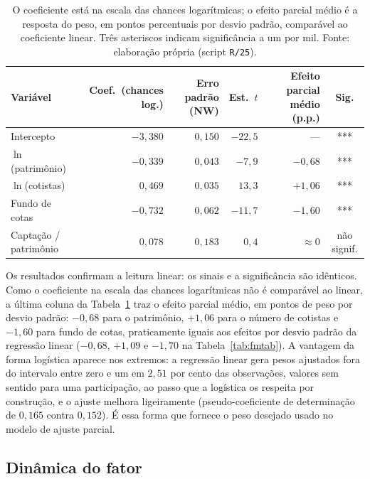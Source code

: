 \documentclass[12pt,a4paper]{article}
\begin{document}
\begin{table}[h]\centering\small
\caption{Regressão transversal logística (resposta fracionária), resumo Fama--MacBeth com
erros-padrão Newey-West.}
\label{tab:logit}
\begin{tabular}{@{}lrrrrc@{}}
\toprule
Variável & Coef.\ (chances log.) & Erro padrão (NW) & Est.\ $t$ & Efeito parcial médio (p.p.) & Sig. \\
\midrule
Intercepto              & $-3{,}380$ & $0{,}150$ & $-22{,}5$ & --- & *** \\
$\ln$(patrimônio)       & $-0{,}339$ & $0{,}043$ & $-7{,}9$  & $-0{,}68$ & *** \\
$\ln$(cotistas)         & $0{,}469$  & $0{,}035$ & $13{,}3$  & $+1{,}06$ & *** \\
Fundo de cotas          & $-0{,}732$ & $0{,}062$ & $-11{,}7$ & $-1{,}60$ & *** \\
Captação / patrimônio   & $0{,}078$  & $0{,}183$ & $0{,}4$   & $\approx 0$ & não signif. \\
\bottomrule
\end{tabular}
\caption*{\footnotesize O coeficiente está na escala das chances logarítmicas; o efeito parcial
médio é a resposta do peso, em pontos percentuais por desvio padrão, comparável ao coeficiente
linear. Três asteriscos indicam significância a um por mil. Fonte: elaboração própria (script
\texttt{R/25}).}
\end{table}

Os resultados confirmam a leitura linear: os sinais e a significância são idênticos. Como o
coeficiente na escala das chances logarítmicas não é comparável ao linear, a última coluna da
Tabela~\ref{tab:logit} traz o efeito parcial médio, em pontos de peso por desvio padrão: $-0{,}68$
para o patrimônio, $+1{,}06$ para o número de cotistas e $-1{,}60$ para fundo de cotas,
praticamente iguais aos efeitos por desvio padrão da regressão linear ($-0{,}68$, $+1{,}09$ e
$-1{,}70$ na Tabela~\ref{tab:fmtab}).
A vantagem da forma logística aparece nos extremos: a regressão linear gera pesos ajustados fora do
intervalo entre zero e um em $2{,}51$ por cento das observações, valores sem sentido para uma
participação, ao passo que a logística os respeita por construção, e o ajuste melhora ligeiramente
(pseudo-coeficiente de determinação de $0{,}165$ contra $0{,}152$). É essa forma que fornece o peso
desejado usado no modelo de ajuste parcial.

\subsection{Dinâmica do fator}
\label{sec:dyn}
\end{document}
